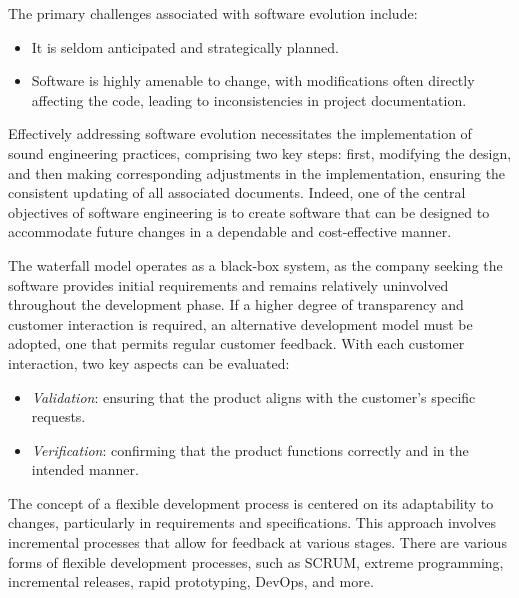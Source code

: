 The primary challenges associated with software evolution include:
\begin{itemize}
    \item It is seldom anticipated and strategically planned.
    \item Software is highly amenable to change, with modifications often directly affecting the code, leading to inconsistencies in project documentation.
\end{itemize}
Effectively addressing software evolution necessitates the implementation of sound engineering practices, comprising two key steps: first, modifying the design, and then making corresponding adjustments in the implementation, ensuring the consistent updating of all associated documents.
Indeed, one of the central objectives of software engineering is to create software that can be designed to accommodate future changes in a dependable and cost-effective manner.

The waterfall model operates as a black-box system, as the company seeking the software provides initial requirements and remains relatively uninvolved throughout the development phase. 
If a higher degree of transparency and customer interaction is required, an alternative development model must be adopted, one that permits regular customer feedback. With each customer interaction, two key aspects can be evaluated:
\begin{itemize}
    \item \textit{Validation}: ensuring that the product aligns with the customer's specific requests.
    \item \textit{Verification}: confirming that the product functions correctly and in the intended manner.
\end{itemize}
The concept of a flexible development process is centered on its adaptability to changes, particularly in requirements and specifications.
This approach involves incremental processes that allow for feedback at various stages.
There are various forms of flexible development processes, such as SCRUM, extreme programming, incremental releases, rapid prototyping, DevOps, and more.